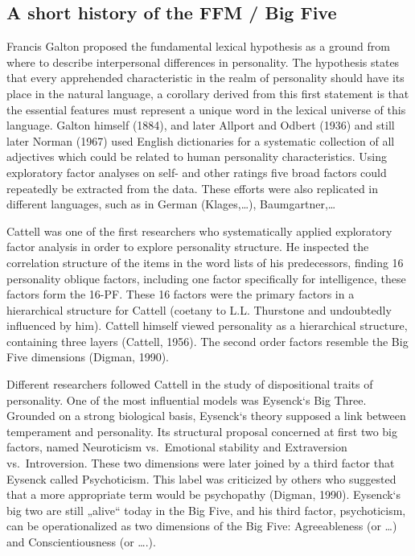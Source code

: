 \documentclass[,man]{apa6}
\theoremstyle{definition}
\theoremstyle{definition}
\theoremstyle{definition}
\theoremstyle{remark}
\begin{document}
\hypertarget{a-short-history-of-the-ffm-big-five}{%
\subsection{A short history of the FFM / Big
Five}\label{a-short-history-of-the-ffm-big-five}}

Francis Galton proposed the fundamental lexical hypothesis as a ground
from where to describe interpersonal differences in personality. The
hypothesis states that every apprehended characteristic in the realm of
personality should have its place in the natural language, a corollary
derived from this first statement is that the essential features must
represent a unique word in the lexical universe of this language. Galton
himself (1884), and later Allport and Odbert (1936) and still later
Norman (1967) used English dictionaries for a systematic collection of
all adjectives which could be related to human personality
characteristics. Using exploratory factor analyses on self- and other
ratings five broad factors could repeatedly be extracted from the data.
These efforts were also replicated in different languages, such as in
German (Klages,\ldots{}), Baumgartner,\ldots{}

Cattell was one of the first researchers who systematically applied
exploratory factor analysis in order to explore personality structure.
He inspected the correlation structure of the items in the word lists of
his predecessors, finding 16 personality oblique factors, including one
factor specifically for intelligence, these factors form the 16-PF.
These 16 factors were the primary factors in a hierarchical structure
for Cattell (coetany to L.L. Thurstone and undoubtedly influenced by
him). Cattell himself viewed personality as a hierarchical structure,
containing three layers (Cattell, 1956). The second order factors
resemble the Big Five dimensions (Digman, 1990).

Different researchers followed Cattell in the study of dispositional
traits of personality. One of the most influential models was Eysenck`s
Big Three. Grounded on a strong biological basis, Eysenck`s theory
supposed a link between temperament and personality. Its structural
proposal concerned at first two big factors, named Neuroticism
vs.~Emotional stability and Extraversion vs.~Introversion. These two
dimensions were later joined by a third factor that Eysenck called
Psychoticism. This label was criticized by others who suggested that a
more appropriate term would be psychopathy (Digman, 1990). Eysenck`s big
two are still „alive`` today in the Big Five, and his third factor,
psychoticism, can be operationalized as two dimensions of the Big Five:
Agreeableness (or \ldots{}) and Conscientiousness (or \ldots{}.).
\end{document}
